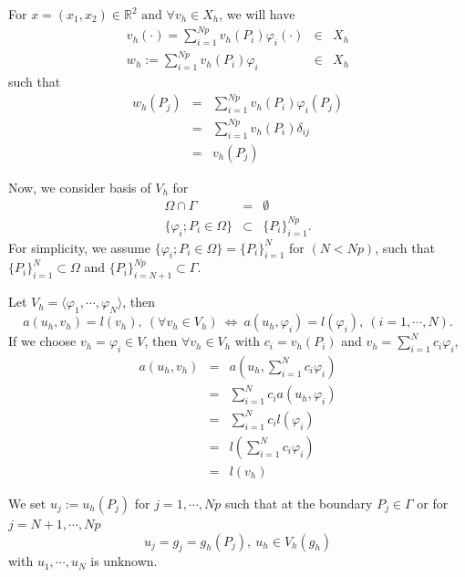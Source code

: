\documentclass[a4paper,10pt]{article}
\begin{document}
For $ x = (x_1,x_2) \in \mathbb{R}^2 \text{ and } \forall v_h \in X_h $, we will have
\begin{eqnarray} \nonumber
v_h (\cdot) = \sum_{i=1}^{Np} v_h(P_i) \varphi_i(\cdot) &\in& X_h\\ \nonumber
w_h := \sum_{i=1}^{Np} v_h(P_i) \varphi_i &\in& X_h
\end{eqnarray}
such that
\begin{eqnarray}
 \nonumber
w_h(P_j) &=& \sum_{i=1}^{Np} v_h (P_i) \varphi_i (P_j)\\ \nonumber
&=& \sum_{i=1}^{Np} v_h (P_i) \delta_{ij}\\ \nonumber
&=& v_h (P_j)
\end{eqnarray}

Now, we consider basis of $ V_h $ for
\begin{eqnarray} \nonumber
\Omega \cap \Gamma &=& \emptyset \\ \nonumber
\{\varphi_i ; P_i \in \Omega \} &\subset& \{P_i \}_{i=1}^{Np}.
\end{eqnarray}
For simplicity, we assume $ \{\varphi_i ; P_i \in \Omega \} = \{P_i\}_{i=1}^N $ for $(N < Np) $, such that $ \{P_i\}_{i=1}^N \subset \Omega $ and $ \{P_i\}_{i=N+1}^{Np} \subset \Gamma $. 

Let $ V_h = \langle \varphi_1, \cdots , \varphi_N \rangle $, then 
\begin{equation*}
a(u_h , v_h)=l(v_h), \ (\forall v_h \in V_h) \ \Leftrightarrow \ a(u_h , \varphi_i) = l(\varphi_i), \ (i=1, \cdots , N).
\end{equation*}
If we choose $ v_h = \varphi_i \in V $, then $ \forall v_h \in V_h $ with $ c_i = v_h (P_i) $ and $ v_h = \sum_{i=1}^{N} c_i \varphi_i $,
\begin{eqnarray}\nonumber
a(u_h,v_h) &=& a(u_h,\sum_{i=1}^{N} c_i \varphi_i)\\ \nonumber
&=&\sum_{i=1}^{N} c_i a (u_h, \varphi_i) \\ \nonumber
&=& \sum_{i=1}^{N} c_i l(\varphi_i)\\ \nonumber
&=& l(\sum_{i=1}^{N} c_i \varphi_i) \\ \nonumber
&=& l(v_h)
\end{eqnarray}

We set $ u_j := u_h(P_j)$ for $ j=1, \cdots , Np $ such that at the boundary $ P_j \in \Gamma $ or for $ j=N+1, \cdots, Np $
\begin{equation*}
u_j = g_j = g_h(P_j), \ u_h \in V_h(g_h)
\end{equation*}
with $ u_{1}, \cdots, u_{N} $ is unknown.
\end{document}
